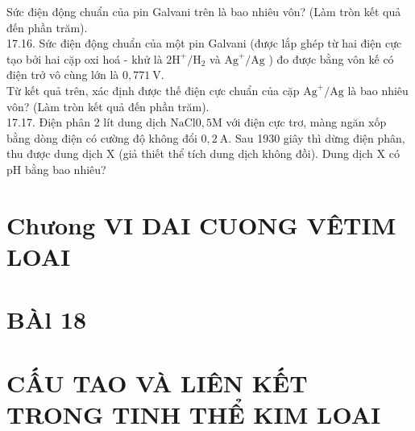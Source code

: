 \documentclass[10pt]{article}
\begin{document}
Sức điện động chuẩn của pin Galvani trên là bao nhiêu vôn? (Làm tròn kết quả đến phần trăm).\\
17.16. Sức điện động chuẩn của một pin Galvani (được lắp ghép từ hai điện cực tạo bởi hai cặp oxi hoá - khử là $2 \mathrm{H}^{+} / \mathrm{H}_{2}$ và $\mathrm{Ag}^{+} / \mathrm{Ag}$ ) đo được bằng vôn kế có điện trở vô cùng lớn là $0,771 \mathrm{~V}$.\\
Từ kết quả trên, xác định được thế điện cực chuẩn của cặp $\mathrm{Ag}^{+} / \mathrm{Ag}$ là bao nhiêu vôn? (Làm tròn kết quả đến phần trăm).\\
17.17. Điện phân 2 lít dung dịch $\mathrm{NaCl} 0,5 \mathrm{M}$ với điện cực trơ, màng ngăn xốp bằng dòng điện có cường độ không đổi $0,2 \mathrm{~A}$. Sau 1930 giây thì dừng điện phân, thu được dung dịch X (giả thiết thể tích dung dịch không đồi). Dung dịch X có pH bằng bao nhiêu?

\section*{Chưong VI DAI CUONG VÊTIM LOAI}
\section*{BÀl 18}
\section*{CẤU TAO VÀ LIÊN KẾT TRONG TINH THỂ KIM LOAI}
\end{document}
